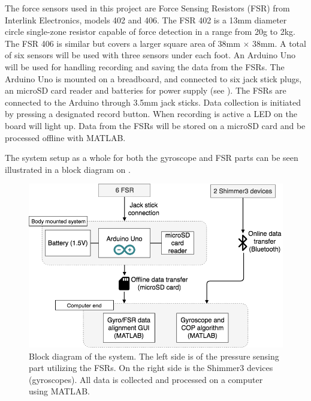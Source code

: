 The force sensors used in this project are Force Sensing Resistors (FSR) from Interlink Electronics, models 402 and 406. The FSR 402 is a 13mm diameter circle single-zone resistor capable of force detection in a range from 20g to 2kg. The FSR 406 is similar but covers a larger square area of 38mm $\times$ 38mm. \cite{IE400} A total of six sensors will be used with three sensors under each foot. 
An Arduino Uno will be used for handling recording and saving the data from the FSRs. The Arduino Uno is mounted on a breadboard, and connected to six jack stick plugs, an microSD card reader and batteries for power supply (see ). The FSRs are connected to the Arduino through 3.5mm jack sticks. Data collection is initiated by pressing a designated record button. When recording is active a LED on the board will light up. Data from the FSRs will be stored on a microSD card and be processed offline with MATLAB.


The system setup as a whole for both the gyroscope and FSR parts can be seen illustrated in a block diagram on .

\begin{figure}[H]
	\includegraphics[width=.6\textwidth]{figures/heleSystemSetup}
	\caption{Block diagram of the system. The left side is of the pressure sensing part utilizing the FSRs. On the right side is the Shimmer3 devices (gyroscopes). All data is collected and processed on a computer using MATLAB.}
	\label{fig:heleSystemSetup}  %
\end{figure}

